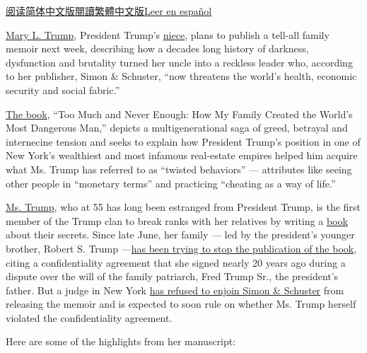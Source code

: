 \href{https://cn.nytimes.com/usa/20200708/mary-trump-book/}{阅读简体中文版}\href{https://cn.nytimes.com/usa/20200708/mary-trump-book/zh-hant/}{閱讀繁體中文版}\href{https://www.nytimes.com/es/2020/07/08/espanol/mundo/libro-sobre-donald-trump.html}{Leer
en español}

\href{https://www.nytimes.com/2020/07/13/us/politics/mary-trump-book.html}{Mary
L. Trump}, President Trump's
\href{https://www.nytimes.com/2020/07/08/books/review-too-much-never-enough-mary-trump.html}{niece},
plans to publish a tell-all family memoir next week, describing how a
decades long history of darkness, dysfunction and brutality turned her
uncle into a reckless leader who, according to her publisher, Simon \&
Schuster, ``now threatens the world's health, economic security and
social fabric.''

\href{https://www.nytimes.com/2020/07/08/books/review/mary-trump-book-takeaways.html}{The
book}, ``Too Much and Never Enough: How My Family Created the World's
Most Dangerous Man,'' depicts a multigenerational saga of greed,
betrayal and internecine tension and seeks to explain how President
Trump's position in one of New York's wealthiest and most infamous
real-estate empires helped him acquire what Ms. Trump has referred to as
``twisted behaviors'' --- attributes like seeing other people in
``monetary terms'' and practicing ``cheating as a way of life.''

\href{https://www.nytimes.com/2020/07/08/books/review/mary-trump-book-takeaways.html}{Ms.
Trump}, who at 55 has long been estranged from President Trump, is the
first member of the Trump clan to break ranks with her relatives by
writing a
\href{https://www.nytimes.com/2020/07/08/books/review-too-much-never-enough-mary-trump.html}{book}
about their secrets. Since late June, her family --- led by the
president's younger brother, Robert S. Trump
---\href{https://www.nytimes.com/2020/06/23/us/politics/mary-trump-book-court.html}{has
been trying to stop the publication of the book}, citing a
confidentiality agreement that she signed nearly 20 years ago during a
dispute over the will of the family patriarch, Fred Trump Sr., the
president's father. But a judge in New York
\href{https://www.nytimes.com/2020/07/01/us/politics/mary-trump-book-lawsuit.html}{has
refused to enjoin Simon \& Schuster} from releasing the memoir and is
expected to soon rule on whether Ms. Trump herself violated the
confidentiality agreement.

Here are some of the highlights from her manuscript:

